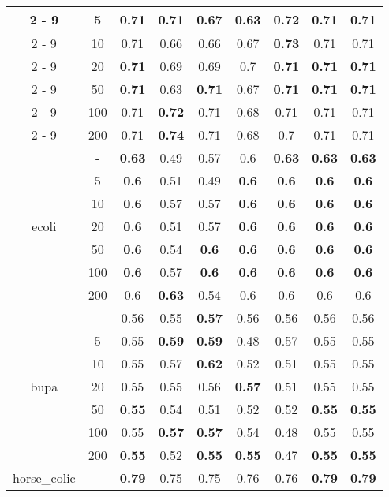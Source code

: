 \documentclass{article}%
\begin{document}
\begin{longtable}{c|c|ccccccc}
\cline{2%
-%
9}%
&5&0.71&0.71&0.67&0.63&\textbf{0.72}&0.71&0.71\\%
\cline{2%
-%
9}%
&10&0.71&0.66&0.66&0.67&\textbf{0.73}&0.71&0.71\\%
\cline{2%
-%
9}%
&20&\textbf{0.71}&0.69&0.69&0.7&\textbf{0.71}&\textbf{0.71}&\textbf{0.71}\\%
\cline{2%
-%
9}%
&50&\textbf{0.71}&0.63&\textbf{0.71}&0.67&\textbf{0.71}&\textbf{0.71}&\textbf{0.71}\\%
\cline{2%
-%
9}%
&100&0.71&\textbf{0.72}&0.71&0.68&0.71&0.71&0.71\\%
\cline{2%
-%
9}%
&200&0.71&\textbf{0.74}&0.71&0.68&0.7&0.71&0.71\\%
\hline%
\multirow{7}{*}{ecoli}&{-}&\textbf{0.63}&0.49&0.57&0.6&\textbf{0.63}&\textbf{0.63}&\textbf{0.63}\\%
\cline{2%
-%
9}%
&5&\textbf{0.6}&0.51&0.49&\textbf{0.6}&\textbf{0.6}&\textbf{0.6}&\textbf{0.6}\\%
\cline{2%
-%
9}%
&10&\textbf{0.6}&0.57&0.57&\textbf{0.6}&\textbf{0.6}&\textbf{0.6}&\textbf{0.6}\\%
\cline{2%
-%
9}%
&20&\textbf{0.6}&0.51&0.57&\textbf{0.6}&\textbf{0.6}&\textbf{0.6}&\textbf{0.6}\\%
\cline{2%
-%
9}%
&50&\textbf{0.6}&0.54&\textbf{0.6}&\textbf{0.6}&\textbf{0.6}&\textbf{0.6}&\textbf{0.6}\\%
\cline{2%
-%
9}%
&100&\textbf{0.6}&0.57&\textbf{0.6}&\textbf{0.6}&\textbf{0.6}&\textbf{0.6}&\textbf{0.6}\\%
\cline{2%
-%
9}%
&200&0.6&\textbf{0.63}&0.54&0.6&0.6&0.6&0.6\\%
\hline%
\multirow{7}{*}{bupa}&{-}&0.56&0.55&\textbf{0.57}&0.56&0.56&0.56&0.56\\%
\cline{2%
-%
9}%
&5&0.55&\textbf{0.59}&\textbf{0.59}&0.48&0.57&0.55&0.55\\%
\cline{2%
-%
9}%
&10&0.55&0.57&\textbf{0.62}&0.52&0.51&0.55&0.55\\%
\cline{2%
-%
9}%
&20&0.55&0.55&0.56&\textbf{0.57}&0.51&0.55&0.55\\%
\cline{2%
-%
9}%
&50&\textbf{0.55}&0.54&0.51&0.52&0.52&\textbf{0.55}&\textbf{0.55}\\%
\cline{2%
-%
9}%
&100&0.55&\textbf{0.57}&\textbf{0.57}&0.54&0.48&0.55&0.55\\%
\cline{2%
-%
9}%
&200&\textbf{0.55}&0.52&\textbf{0.55}&\textbf{0.55}&0.47&\textbf{0.55}&\textbf{0.55}\\%
\hline%
\multirow{7}{*}{horse\_colic}&{-}&\textbf{0.79}&0.75&0.75&0.76&0.76&\textbf{0.79}&\textbf{0.79}\\%

\end{longtable}
\end{document}
